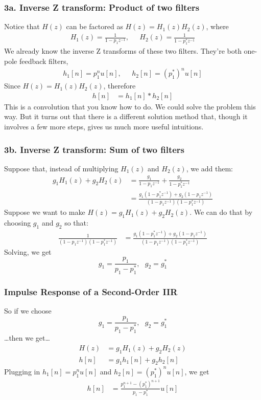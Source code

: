 \documentclass{beamer}
\begin{document}
\begin{frame}
  \frametitle{3a. Inverse Z transform: Product of two filters}

  Notice that  $H(z)$ can be factored as  $H(z)= H_1(z)H_2(z)$, where
  \begin{align*}
    H_1(z)=\frac{1}{1-p_1z^{-1}},&~~~H_2(z)=\frac{1}{1-p_1^*z^{-1}}
  \end{align*}
  We already know the inverse Z transforms of these two filters.
  They're both one-pole feedback filters,
  \begin{align*}
    h_1[n] = p_1^nu[n],&~~~h_2[n]=(p_1^*)^nu[n]
  \end{align*}
  Since $H(z)=H_1(z)H_2(z)$, therefore
  \begin{align*}
    h[n] &= h_1[n]\ast h_2[n]
  \end{align*}
  This is a convolution that you know how to do.  We could solve the problem this way.
  But it turns out that there is a different solution method that, though
  it involves a few more steps, gives us much more useful intuitions.
\end{frame}

\begin{frame}
  \frametitle{3b. Inverse Z transform: Sum of two filters}

  Suppose that, instead of multiplying $H_1(z)$ and $H_2(z)$, we add them:
  \begin{align*}
    g_1H_1(z)+g_2H_2(z) &= \frac{g_1}{1-p_1z^{-1}}+\frac{g_2}{1-p_1^*z^{-1}}\\
    &= \frac{g_1(1-p_1^*z^{-1})+g_2(1-p_1z^{-1})}{(1-p_1z^{-1})(1-p_1^*z^{-1})}
  \end{align*}
  Suppose we want to make $H(z)=g_1H_1(z)+g_2H_2(z)$.  We can do that
  by choosing $g_1$ and $g_2$ so that:
  \begin{align*}
    \frac{1}{(1-p_1z^{-1})(1-p_1^*z^{-1})} &=
    \frac{g_1(1-p_1^*z^{-1})+g_2(1-p_1z^{-1})}{(1-p_1z^{-1})(1-p_1^*z^{-1})}
  \end{align*}
  Solving, we get
  \begin{displaymath}
    g_1 = \frac{p_1}{p_1-p_1^*},~~~g_2 = g_1^*
  \end{displaymath}
\end{frame}

\begin{frame}
  \frametitle{Impulse Response of a Second-Order IIR}

  So if we choose
  \begin{displaymath}
    g_1 = \frac{p_1}{p_1-p_1^*},~~~g_2 = g_1^*
  \end{displaymath}
  \ldots then we get\ldots
  \begin{align*}
    H(z) &= g_1H_1(z)+g_2H_2(z)\\
    h[n] &= g_1h_1[n]+g_2h_2[n]
  \end{align*}
  Plugging in $h_1[n]=p_1^nu[n]$ and $h_2[n]=(p_1^*)^nu[n]$, we get
  \begin{align*}
    h[n] &= \frac{p_1^{n+1}-(p_1^*)^{n+1}}{p_1-p_1^*} u[n]
  \end{align*}
\end{frame}
\end{document}
